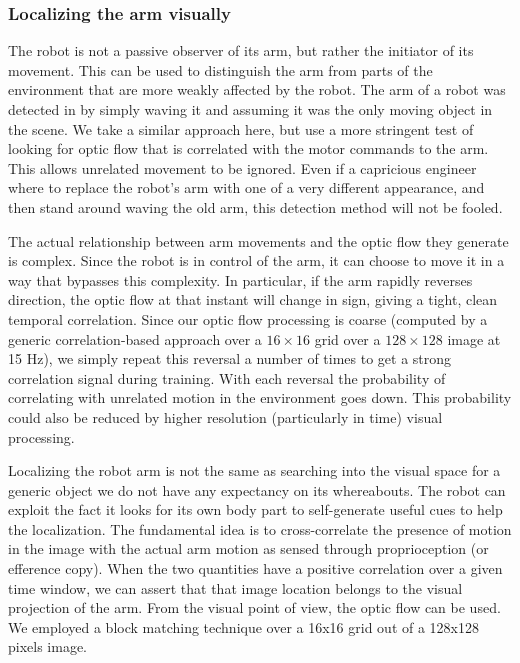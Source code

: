 \subsubsection*{Localizing the arm visually}

The robot is not a passive observer of its arm, but rather the
initiator of its movement.  This can be used to distinguish the arm
from parts of the environment that are more weakly affected by the
robot.  The arm of a robot was detected in \cite{Marjanovic-96-SAB} by
simply waving it and assuming it was the only moving object in the
scene.  We take a similar approach here, but use a more
stringent test of looking for optic flow that is correlated with
the motor commands to the arm.  This allows unrelated movement
to be ignored.  Even if a capricious engineer where to 
replace the robot's arm with one of a very different appearance,
and then stand around waving the old arm, this detection method
will not be fooled.  

The actual relationship between arm movements and the optic flow they
generate is complex.  Since the robot is in control of the arm, it can
choose to move it in a way that bypasses this complexity.  In
particular, if the arm rapidly reverses direction, the optic flow at
that instant will change in sign, giving a tight, clean temporal
correlation.  Since our optic flow processing is coarse (computed by 
a generic correlation-based approach over a $16\times
16$ grid over a $128\times 128$ image at 15 Hz), we simply repeat this
reversal a number of times to get a strong correlation signal during
training.  With each reversal the probability of correlating with
unrelated motion in the environment goes down.  This probability could
also be reduced by higher resolution (particularly in time) visual
processing.

\ifverbose
Localizing the robot arm is not the same as searching into the visual
space for a generic object we do not have any expectancy on its
whereabouts. The robot can exploit the fact it looks for its own body
part to self-generate useful cues to help the localization. The
fundamental idea is to cross-correlate the presence of motion in the
image with the actual arm motion as sensed through proprioception (or
efference copy). When the two quantities have a positive correlation
over a given time window, we can assert that that image location
belongs to the visual projection of the arm. From the visual point of
view, the optic flow can be used. We employed a block matching
technique over a 16x16 grid out of a 128x128 pixels image.
\fi

